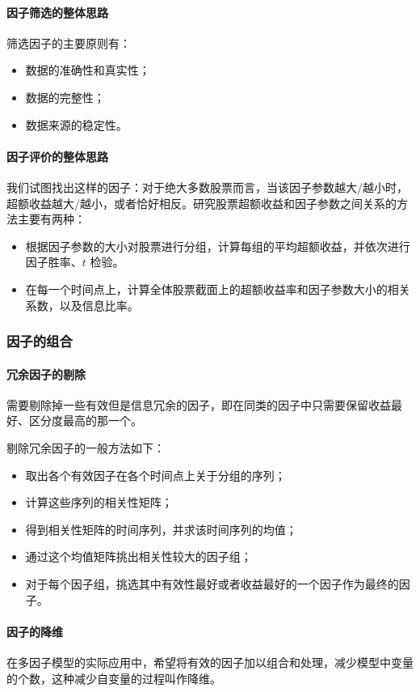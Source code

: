 \paragraph{因子筛选的整体思路} 筛选因子的主要原则有：
\begin{itemize}
    \item 数据的准确性和真实性；
    \item 数据的完整性；
    \item 数据来源的稳定性。
\end{itemize}

\paragraph{因子评价的整体思路} 我们试图找出这样的因子：对于绝大多数股票而言，当该因子参数越大/越小时，超额收益越大/越小，或者恰好相反。研究股票超额收益和因子参数之间关系的方法主要有两种：
\begin{itemize}
    \item 根据因子参数的大小对股票进行分组，计算每组的平均超额收益，并依次进行因子胜率、$t$ 检验。
    \item 在每一个时间点上，计算全体股票截面上的超额收益率和因子参数大小的相关系数，以及信息比率。
\end{itemize}

\subsubsection*{因子的组合}
\paragraph{冗余因子的剔除} 需要剔除掉一些有效但是信息冗余的因子，即在同类的因子中只需要保留收益最好、区分度最高的那一个。

剔除冗余因子的一般方法如下：
\begin{itemize}
    \item 取出各个有效因子在各个时间点上关于分组的序列；
    \item 计算这些序列的相关性矩阵；
    \item 得到相关性矩阵的时间序列，并求该时间序列的均值；
    \item 通过这个均值矩阵挑出相关性较大的因子组；
    \item 对于每个因子组，挑选其中有效性最好或者收益最好的一个因子作为最终的因子。
\end{itemize}
\paragraph{因子的降维} 在多因子模型的实际应用中，希望将有效的因子加以组合和处理，减少模型中变量的个数，这种减少自变量的过程叫作降维。

